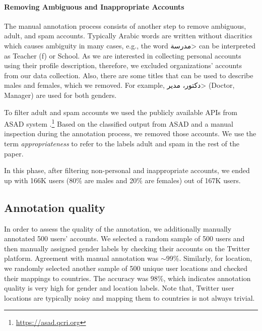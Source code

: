 \documentclass[sigconf,authorversion,nonacm]{acmart}
\begin{document}
\paragraph{Removing Ambiguous and Inappropriate Accounts}
The manual annotation process consists of another step to remove ambiguous, adult, and spam accounts. Typically Arabic words are written without diacritics which causes ambiguity in many cases, e.g., the word \<مدرسة> can be interpreted as Teacher (f) or School. As we are interested in collecting personal accounts using their profile description, therefore, we excluded organizations' accounts from our data collection. Also, there are some titles that can be used to describe males and females, which we removed. For example, \<دكتور، مدير> (Doctor, Manager) are used for both genders.

To filter adult and spam accounts we used the publicly available APIs from ASAD system
\cite{hassan2021asad}.\footnote{\url{https://asad.qcri.org}} Based on the classified output from ASAD and a manual inspection during the annotation process, we removed those accounts. We use the term \textit{appropriateness} to refer to the labels adult and spam in the rest of the paper.  

In this phase, after filtering non-personal and inappropriate accounts, we ended up with 166K users (80\% are males and 20\% are females) out of 167K users. 


\subsection{Annotation quality}
In order to assess the quality of the annotation, we additionally manually annotated 500 users' accounts. We selected a random sample of 500 users and then manually assigned gender labels by checking their accounts on the Twitter platform. Agreement with manual annotation was $\sim$99\%. Similarly, for location, we randomly selected another sample of 500 unique user locations and checked their mappings to countries. The accuracy was 98\%, which indicates annotation quality is very high for gender and location labels. Note that, Twitter user locations are typically noisy and mapping them to countries is not always trivial.
\end{document}

